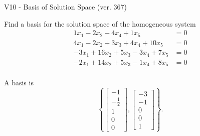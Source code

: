 \begin{exercise}
  \begin{exerciseTitle}V10 - Basis of Solution Space (ver. 367)\end{exerciseTitle}
  \begin{exerciseStatement}
    Find a basis for the solution space of the homogeneous system 
\begin{align*}
 1 x_ 1 -2 x_ 2 -4 x_ 4 + 1 x_ 5 &= 0  \\ 
  4 x_ 1 -2 x_ 2 + 3 x_ 3 + 4 x_ 4 + 10 x_ 5 &= 0  \\ 
  -3 x_ 1 + 16 x_ 2 + 5 x_ 3 -3 x_ 4 + 7 x_ 5 &= 0  \\ 
  -2 x_ 1 + 14 x_ 2 + 5 x_ 3 -1 x_ 4 + 8 x_ 5 &= 0  \\ 
 \end{align*}


 
  \end{exerciseStatement}

  \begin{exerciseAnswer}
   A basis is   
\[\left\{\left[\begin{array}{c}
-1 \\
-\frac{1}{2} \\
1 \\
0 \\
0
\end{array}\right] , \left[\begin{array}{c}
-3 \\
-1 \\
0 \\
0 \\
1
\end{array}\right]\right\}.\]

  


  \end{exerciseAnswer}
\end{exercise}